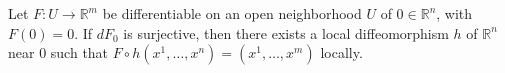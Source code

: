 Let $F: U \to \mathbb{R}^m$ be differentiable on an open neighborhood $U$ of $0 \in \mathbb{R}^n$, with $F(0) = 0$. If $dF_0$ is surjective, then there exists a local diffeomorphism $h$ of $\mathbb{R}^n$ near $0$ such that $F \circ h(x^1, \ldots, x^n) = (x^1, \ldots, x^m)$ locally.